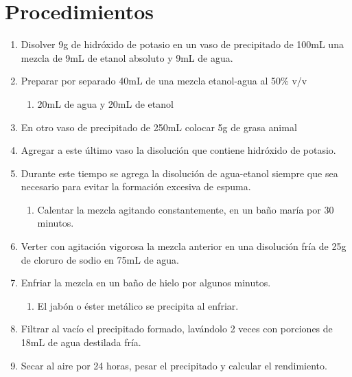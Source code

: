 \section{Procedimientos}

\begin{enumerate}
    \item Disolver 9g de hidróxido de potasio en un vaso de precipitado de 100mL una mezcla de 9mL de etanol absoluto y 9mL de agua.
    \item Preparar por separado 40mL de una mezcla etanol-agua al 50\% v/v
    \begin{enumerate}
        \item 20mL de agua y 20mL de etanol
    \end{enumerate}
    
    \item En otro vaso de precipitado de 250mL colocar 5g de grasa animal
    \item Agregar a este último vaso la disolución que contiene hidróxido de potasio.
    \item Durante este tiempo se agrega la disolución de agua-etanol siempre que sea necesario para evitar la formación excesiva de espuma.
    \begin{enumerate}
        \item Calentar la mezcla agitando constantemente, en un baño maría por 30 minutos.
    \end{enumerate}
    
    \item Verter con agitación vigorosa la mezcla anterior en una disolución fría de 25g de cloruro de sodio en 75mL de agua.
    \item Enfriar la mezcla en un baño de hielo por algunos minutos.
    \begin{enumerate}
        \item El jabón o éster metálico se precipita al enfriar.
    \end{enumerate}
    
    \item Filtrar al vacío el precipitado formado, lavándolo 2 veces con porciones de 18mL de agua destilada fría.
    \item Secar al aire por 24 horas, pesar el precipitado y calcular el rendimiento.
\end{enumerate}